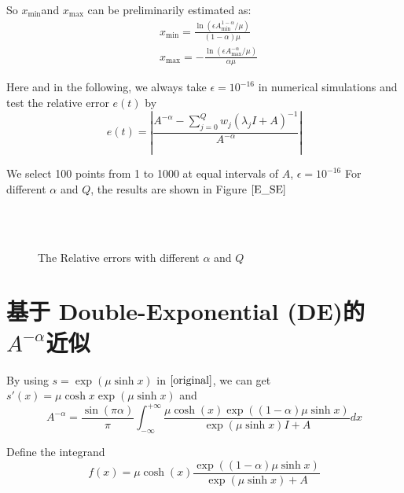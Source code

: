 So  $x_{\min}$and $x_{\max}$ can be preliminarily estimated as:
\begin{equation}
\begin{aligned}
&x_{\min}=\frac{\ln(\epsilon A_{\min}^{1-\alpha}/\mu)}{(1-\alpha)\mu}\\
&x_{\max}=-\frac{\ln(\epsilon A_{\max}^{-\alpha}/\mu)}{\alpha \mu}
\end{aligned}
\end{equation}

Here and in the following, we always take $\epsilon=10^{-16}$ in numerical simulations and test the relative error $e(t)$ by
\begin{equation}
e(t)=\left|\frac{{A}^{-\alpha}-\sum_{j=0}^{Q}w_j(\lambda_jI+A)^{-1}}{{A}^{-\alpha}}\right|
\label{error}
\end{equation}

We select 100 points from 1 to 1000 at equal intervals of $A$,  $\epsilon=10^{-16}$ For different $\alpha$ and $Q$, the results are shown in Figure $\ref{E_SE}$

\begin{figure}[htbp]
\centering
{}
~~
~~
\\
~~
~~
  \caption{The Relative errors with different $\alpha$ and $Q$}
  \label{E_SE}
\end{figure}


\section{基于 Double-Exponential (DE)的$A^{-\alpha}$近似}

By using $s=\exp(\mu\sinh x)$ in $\eqref{original}$,  we can get $s'(x)=\mu \cosh x \exp(\mu \sinh x)$ and
\begin{equation}
{A}^{-\alpha}=\frac{\sin(\pi \alpha)}{\pi}\int_{-\infty}^{+\infty}
\frac{\mu\cosh(x)\exp((1-\alpha)\mu\sinh x)}{\exp(\mu\sinh x){I}+A}dx
\label{de}
\end{equation}

Define the integrand
\begin{equation}
f(x)=\mu\cosh(x)\frac{\exp((1-\alpha)\mu\sinh x)}{\exp(\mu\sinh x)+A}
\label{function_DE}
\end{equation}

